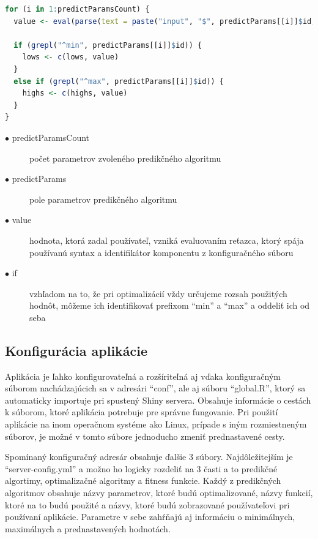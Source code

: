 \documentclass[a4paper,slovak,12pt,appendix]{article}
\begin{document}
\begin{lstlisting}[language=R]
for (i in 1:predictParamsCount) {
  value <- eval(parse(text = paste("input", "$", predictParams[[i]]$id, sep = "")))

  if (grepl("^min", predictParams[[i]]$id)) {
    lows <- c(lows, value)
  }
  else if (grepl("^max", predictParams[[i]]$id)) {
    highs <- c(highs, value)
  }
}
\end{lstlisting}

\begin{description}
  \item[$\bullet$ predictParamsCount] počet parametrov zvoleného predikčného algoritmu
  \item[$\bullet$ predictParams] pole parametrov predikčného algoritmu
  \item[$\bullet$ value] hodnota, ktorá zadal používateľ, vzniká evaluovaním reťazca, ktorý spája používanú syntax a identifikátor komponentu z konfiguračného súboru
  \item[$\bullet$ if] vzhľadom na to, že pri optimalizácií vždy určujeme rozsah použitých hodnôt, môžeme ich identifikovať prefixom ``min'' a ``max'' a oddeliť ich od seba
\end{description}


\subsection{Konfigurácia aplikácie}
Aplikácia je ľahko konfigurovateľná a rozšíriteľná aj vďaka konfiguračným
súborom nachádzajúcich sa v adresári ``conf'', ale aj súboru ``global.R'',
ktorý sa automaticky importuje pri spustený Shiny servera. Obsahuje informácie
o cestách k súborom, ktoré aplikácia potrebuje pre správne fungovanie. Pri
použití aplikácie na inom operačnom systéme ako Linux, prípade s iným
rozmiestneným súborov, je možné v tomto súbore jednoducho zmeniť prednastavené
cesty.

Spomínaný konfiguračný adresár obsahuje ďalšie 3 súbory. Najdôležitejším je
``server-config.yml'' a možno ho logicky rozdeliť na 3 časti a to predikčné
algortimy, optimalizačné algoritmy a fitness funkcie. Každý z predikčných
algoritmov obsahuje názvy parametrov, ktoré budú optimalizované, názvy funkcií,
ktoré na to budú použité a názvy, ktoré budú zobrazované používateľovi pri
používaní aplikácie. Parametre v sebe zahŕňajú aj informáciu o minimálnych,
maximálnych a prednastavených hodnotách.
\end{document}
